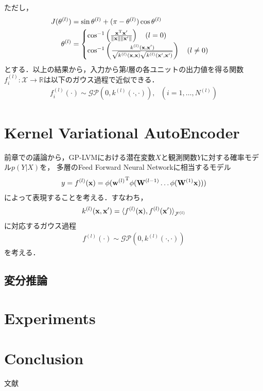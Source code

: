 \documentclass[11pt,a4j]{article}
\begin{document}
      ただし，
      \begin{align}
        J(\theta^{(l)}) &= \sin \theta^{(l)} + (\pi - \theta^{(l)}) \cos \theta^{(l)} \\
        \theta^{(l)} &=
        \begin{cases}
          \cos^{-1} \left( \frac{{\bf x}^{\mathrm{T}} {\bf x}'}{ \|{\bf x}\| \|{\bf x}'\| } \right) ~~~ (l = 0) \\
          \cos^{-1} \left( \frac{k^{(l)}( {\bf x}, {\bf x}' )}{ \sqrt{ k^{(l)}({\bf x}, {\bf x}) } \sqrt{ k^{(l)}({\bf x}', {\bf x}') } } \right) ~~~ (l \neq 0) 
        \end{cases}
      \end{align}
      とする．以上の結果から，入力から第$l$層の各ユニットの出力値を得る関数$f^{(l)}_i: \mathcal{X} \to \mathbb{R}$は以下のガウス過程で近似できる．
      \begin{align}
        f^{(l)}_i(\cdot) \sim \mathcal{GP}( 0, k^{(l)}(\cdot,\cdot) ), ~~~ (i=1,\dots,N^{(l)})
      \end{align}

  \section{Kernel Variational AutoEncoder}
    前章での議論から，GP-LVMにおける潜在変数$X$と観測関数$Y$に対する確率モデル$p(Y|X)$を，
    多層のFeed Forward Neural Networkに相当するモデル
    \begin{align}
      y = f^{(l)} ({\bf x}) = \phi( {{\bf w}^{(l)}}^{\mathrm{T}} \phi( {\bf W}^{(l-1)}  \dots \phi( {\bf W}^{(1)} {\bf x}) ) )
    \end{align}
    によって表現することを考える．すなわち，
    \begin{align}
      k^{(l)}( {\bf x}, {\bf x}' ) = { \langle f^{(l)} ({\bf x}), f^{(l)} ({\bf x}') \rangle }_{\mathcal{F}^{(l)}}
    \end{align}
    に対応するガウス過程
    \begin{align}
      f^{(l)}(\cdot) \sim \mathcal{GP}(0, k^{(l)}(\cdot,\cdot))
    \end{align}
    を考える．

    \subsection{変分推論}

  \section{Experiments}
  \section{Conclusion}
    文献\cite{Hinton1995BayesianLF}
    \cite{DLGP2018} \cite{KMDL2009} \cite{LawrenceGPLVM2004} \cite{LawrenceGPLVM2005}
    \cite{SparseGP2006} \cite{VariationalSparseGP2009} \cite{BayesGP2010}
    \cite{GPBIGDATA2013}


  
\end{document}
